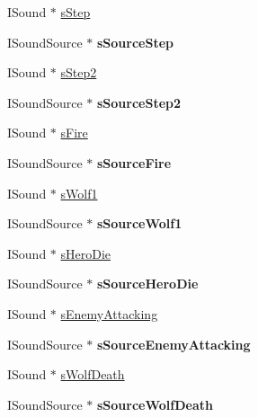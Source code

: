 \begin{DoxyCompactItemize}
\item 
ISound $\ast$ \hyperlink{class_sound_ae8746893263e4c23113008db6d87327f}{sStep}
\item 
\hypertarget{class_sound_a3078c9ac222fe934ec907bbc70c06a2a}{
ISoundSource $\ast$ {\bfseries sSourceStep}}
\label{class_sound_a3078c9ac222fe934ec907bbc70c06a2a}

\item 
ISound $\ast$ \hyperlink{class_sound_a4aa97616ede6628f495c5f5f8232b221}{sStep2}
\item 
\hypertarget{class_sound_aad29b4714b05e514b9d8dfe1b2852bdc}{
ISoundSource $\ast$ {\bfseries sSourceStep2}}
\label{class_sound_aad29b4714b05e514b9d8dfe1b2852bdc}

\item 
ISound $\ast$ \hyperlink{class_sound_a443857ecec851ccd50833993807e7bdb}{sFire}
\item 
\hypertarget{class_sound_a9ada760058365c9878f2ea821390277c}{
ISoundSource $\ast$ {\bfseries sSourceFire}}
\label{class_sound_a9ada760058365c9878f2ea821390277c}

\item 
ISound $\ast$ \hyperlink{class_sound_a3bc73aabde333948c2bf601bcfd95d71}{sWolf1}
\item 
\hypertarget{class_sound_aa10c09c534057f706ae2ee7165ee5202}{
ISoundSource $\ast$ {\bfseries sSourceWolf1}}
\label{class_sound_aa10c09c534057f706ae2ee7165ee5202}

\item 
ISound $\ast$ \hyperlink{class_sound_a99475d2ce42a16175b06d47bcc018294}{sHeroDie}
\item 
\hypertarget{class_sound_af5e3c5a7dff2e999a28e26f7e50bf570}{
ISoundSource $\ast$ {\bfseries sSourceHeroDie}}
\label{class_sound_af5e3c5a7dff2e999a28e26f7e50bf570}

\item 
ISound $\ast$ \hyperlink{class_sound_a675a65579f9f4b42e7ff1191417e7229}{sEnemyAttacking}
\item 
\hypertarget{class_sound_a8d2d3a40d329d53f834bf0d42641c895}{
ISoundSource $\ast$ {\bfseries sSourceEnemyAttacking}}
\label{class_sound_a8d2d3a40d329d53f834bf0d42641c895}

\item 
ISound $\ast$ \hyperlink{class_sound_a1cf6c953b556197d1e2d63d45af02945}{sWolfDeath}
\item 
\hypertarget{class_sound_a0e097e444cedf0926896ac249a13c870}{
ISoundSource $\ast$ {\bfseries sSourceWolfDeath}}
\label{class_sound_a0e097e444cedf0926896ac249a13c870}


\end{DoxyCompactItemize}
